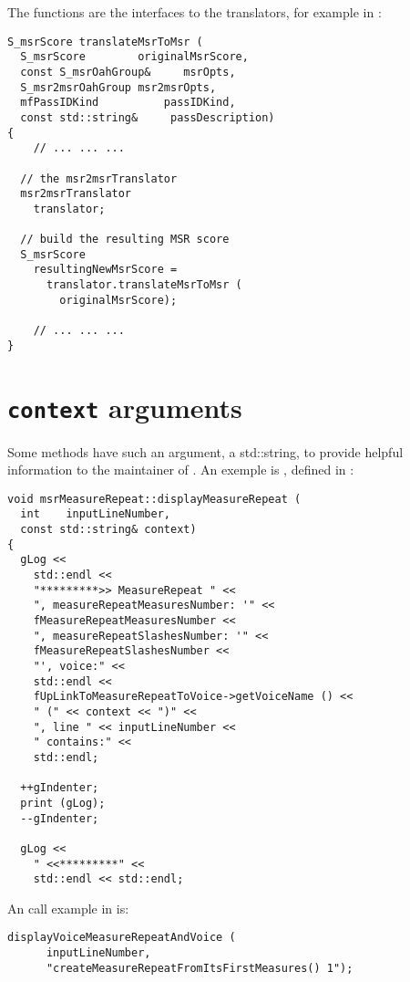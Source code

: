 The  functions are the interfaces to the translators, for example in :
\begin{lstlisting}[language=CPlusPlus]
S_msrScore translateMsrToMsr (
  S_msrScore        originalMsrScore,
  const S_msrOahGroup&     msrOpts,
  S_msr2msrOahGroup msr2msrOpts,
  mfPassIDKind          passIDKind,
  const std::string&     passDescription)
{
	// ... ... ...

  // the msr2msrTranslator
  msr2msrTranslator
    translator;

  // build the resulting MSR score
  S_msrScore
    resultingNewMsrScore =
      translator.translateMsrToMsr (
        originalMsrScore);

	// ... ... ...
}
\end{lstlisting}


\section{{\tt context} arguments}

Some methods have such an argument, a std::string, to provide helpful information to the maintainer of \mf. An exemple is , defined in :
\begin{lstlisting}[language=CPlusPlus]
void msrMeasureRepeat::displayMeasureRepeat (
  int    inputLineNumber,
  const std::string& context)
{
  gLog <<
    std::endl <<
    "*********>> MeasureRepeat " <<
    ", measureRepeatMeasuresNumber: '" <<
    fMeasureRepeatMeasuresNumber <<
    ", measureRepeatSlashesNumber: '" <<
    fMeasureRepeatSlashesNumber <<
    "', voice:" <<
    std::endl <<
    fUpLinkToMeasureRepeatToVoice->getVoiceName () <<
    " (" << context << ")" <<
    ", line " << inputLineNumber <<
    " contains:" <<
    std::endl;

  ++gIndenter;
  print (gLog);
  --gIndenter;

  gLog <<
    " <<*********" <<
    std::endl << std::endl;
\end{lstlisting}

An call example in  is:
\begin{lstlisting}[language=CPlusPlus]
    displayVoiceMeasureRepeatAndVoice (
      inputLineNumber,
      "createMeasureRepeatFromItsFirstMeasures() 1");
\end{lstlisting}


